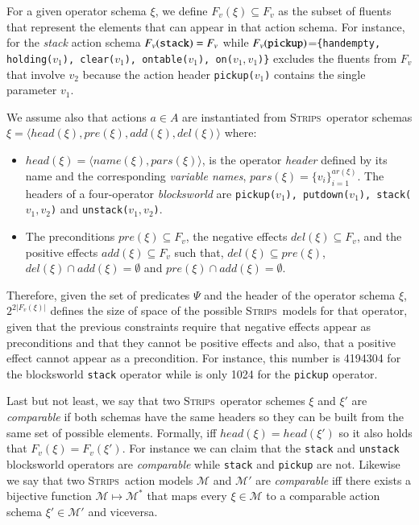 \documentclass[3p,times]{elsarticle}
\newcommand{\strips}{\textsc{Strips}}     %
\newcommand{\tup}[1]{{\langle #1 \rangle}}
\begin{document}
For a given operator schema $\xi$, we define $F_v(\xi)\subseteq F_v$ as the subset of fluents that represent the elements that can appear in that action schema. For instance, for the {\em stack} action schema $F_v({\tt stack})=F_v$ while $F_v({\tt pickup})$={\small\tt\{handempty, holding($v_1$), clear($v_1$), ontable($v_1$), on($v_1,v_1$)\}} excludes the fluents from $F_v$ that involve $v_2$ because the action header {\small\tt pickup($v_1$)} contains the single parameter $v_1$.

We assume also that actions $a\in A$ are instantiated from \strips\ operator schemas $\xi=\tup{head(\xi),pre(\xi),add(\xi),del(\xi)}$ where:
\begin{itemize}
\item $head(\xi)=\tup{name(\xi),pars(\xi)}$, is the operator {\em header} defined by its name and the corresponding {\em variable names}, $pars(\xi)=\{v_i\}_{i=1}^{ar(\xi)}$. The headers of a four-operator {\em blocksworld} are {\small\tt pickup($v_1$), putdown($v_1$), stack($v_1,v_2$)} and {\small\tt unstack($v_1,v_2$)}.
\item The preconditions $pre(\xi)\subseteq F_v$, the negative effects $del(\xi)\subseteq F_v$, and the positive effects $add(\xi)\subseteq F_v$ such that, $del(\xi)\subseteq pre(\xi)$, $del(\xi)\cap add(\xi)=\emptyset$ and $pre(\xi)\cap add(\xi)=\emptyset$.
\end{itemize}
Therefore, given the set of predicates $\Psi$ and the header of the operator schema $\xi$, $2^{2|F_v(\xi)|}$ defines the size of space of the possible \strips\ models for that operator, given that the previous constraints require that negative effects appear as preconditions and that they cannot be positive effects and also, that a positive effect cannot appear as a precondition. For instance, this number is 4194304 for the blocksworld {\tt stack} operator while is only 1024 for the {\tt pickup} operator.

Last but not least, we say that two \strips\ operator schemes $\xi$ and $\xi'$ are {\em comparable} if both schemas have the same headers so they can be built from the same set of possible elements. Formally, iff $head(\xi)=head(\xi')$ so it also holds that $F_v(\xi)=F_v(\xi')$. For instance we can claim that the {\tt stack} and {\tt unstack} blocksworld operators are {\em comparable} while  {\tt stack} and {\tt pickup} are not. Likewise we say that two \strips\ action models $\mathcal{M}$ and $\mathcal{M}'$ are {\em comparable} iff there exists a bijective function $\mathcal{M} \mapsto \mathcal{M}^*$ that maps every $\xi\in\mathcal{M}$ to a comparable action schema $\xi'\in\mathcal{M'}$ and viceversa.
\end{document}
